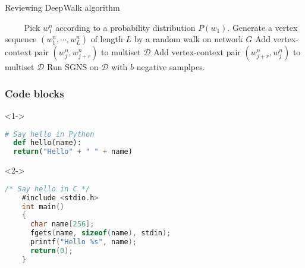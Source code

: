 \documentclass[UTF8, aspectratio=169 , 10pt，punct=kaiming]{beamer} %
\begin{document}
\begin{frame}{Reviewing DeepWalk algorithm}
  \begin{algorithm}[H]
    \caption{Reviewing random walk + skip gram}%
    \LinesNumbered %
     {
      　　 Pick $w_{1}^{n}$ according to a probability distribution $P\left(w_{1}\right)$.
          Generate a vertex sequence $\left(w_{1}^{n}, \cdots, w_{L}^{n}\right)$ of length $L$ by a random walk on network $G$ \;
           {
             {
              Add vertex-context pair $\left(w_{j}^{n}, w_{j+r}^{n}\right)$ to multiset $\mathcal{D}$ \;
              Add vertex-context pair $\left(w_{j+r}^{n}, w_{j}^{n}\right)$ to multiset $\mathcal{D}$
            }
          }
    }
    Run SGNS on $ \mathcal{D}$ with $b$  negative samplpes.
  \end{algorithm}
\end{frame}

\begin{frame}[fragile]
  \frametitle{Code blocks}

\begin{uncoverenv}<1->
  \begin{lstlisting}[language=Python]
  # Say hello in Python
  def hello(name):
  return("Hello" + " " + name)
  \end{lstlisting}
\end{uncoverenv}
    
\begin{uncoverenv}<2->
  \begin{lstlisting}[language=C]
    /* Say hello in C */
    #include <stdio.h>
    int main()
    {
      char name[256];
      fgets(name, sizeof(name), stdin);
      printf("Hello %s", name);
      return(0);
    }
  \end{lstlisting}
  \end{uncoverenv}
\end{frame}
\end{document}
